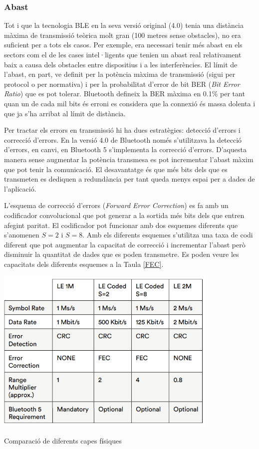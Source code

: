 \subsubsection{Abast}
Tot i que la tecnologia BLE en la seva versió original (4.0) tenia una distància màxima de transmissió teòrica molt gran (100 metres sense obstacles), no era suficient per a tots els casos.
Per exemple, era necessari tenir més abast en els sectors com el de les cases intel·ligents que tenien un abast real relativament baix a causa dels obstacles entre dispositius i a les interferències.
El límit de l'abast, en part, ve definit per la potència màxima de transmissió (sigui per protocol o per normativa) i per la probabilitat d'error de bit BER (\textit{Bit Error Ratio}) que es pot tolerar.
Bluetooth defineix la BER màxima en 0.1\% per tant quan un de cada mil bits és erroni es considera que la connexió és massa dolenta i que ja s'ha arribat al límit de distància.

Per tractar els errors en transmissió hi ha dues estratègies: detecció d'errors i correcció d'errors.
En la versió 4.0 de Bluetooth només s'utilitzava la detecció d'errors, en canvi, en Bluetooth 5 s'implementa la correcció d'errors.
D'aquesta manera sense augmentar la potència transmesa es pot incrementar l'abast màxim que pot tenir la comunicació.
El desavantatge és que més bits dels que es transmeten es dediquen a redundància per tant queda menys espai per a dades de l'aplicació.


L'esquema de correcció d'errors (\textit{Forward Error Correction}) es fa amb un codificador convolucional que pot generar a la sortida més bits dels que entren afegint paritat. El codificador pot funcionar amb dos esquemes diferents que s'anomenen $S=2$ i $S=8$.
Amb els diferents esquemes s'utilitza una taxa de codi diferent que pot augmentar la capacitat de correcció i incrementar l'abast però disminuir la quantitat de dades que es poden transmetre.
Es poden veure les capacitats dels diferents esquemes a la Taula \ref{FEC}.

\begin{table}[htb]
	\begin{center}
		\includegraphics[width=0.8\textwidth]{./images/LE_PHY_edited.png}
		\caption{Comparació de diferents capes físiques \cite{BLE_5_improvement_over_4}}
		\label{FEC}
	\end{center}
\end{table}

